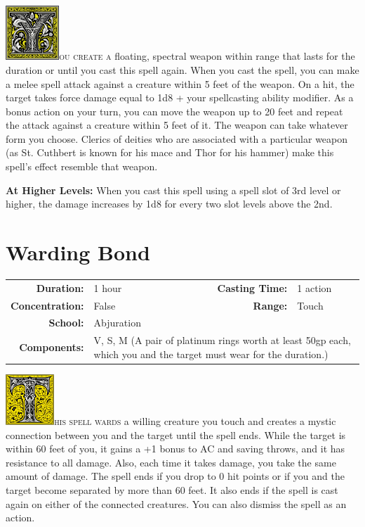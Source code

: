 \documentclass[12pt,showtrims]{memoir}
\begin{document}
\vspace{1\baselineskip}\noindent 
\lettrine[lines=4]{\includegraphics[height=58pt]{initials/Y.png}}{ou create a} floating, spectral weapon within range that lasts for the duration or until you cast this spell again. When you cast the spell, you can make a melee spell attack against a creature within 5 feet of the weapon. On a hit, the target takes force damage equal to 1d8 + your spellcasting ability modifier. As a bonus action on your turn, you can move the weapon up to 20 feet and repeat the attack against a creature within 5 feet of it. The weapon can take whatever form you choose. Clerics of deities who are associated with a particular weapon (as St. Cuthbert is known for his mace and Thor for his hammer) make this spell's effect resemble that weapon.

\vspace{8pt} \noindent\textbf{At Higher Levels:} When you cast this spell using a spell slot of 3rd level or higher, the damage increases by 1d8 for every two slot levels above the 2nd.
\newpage
\section*{Warding Bond}

{
\small\centering\vspace{-6pt}
\begin{tabular}{rlrl}
\toprule

\textbf{Duration:} & 1 hour &
\textbf{Casting Time:} & 1 action \\
\textbf{Concentration:} & False &
\textbf{Range:} & Touch \\
\textbf{School:} & Abjuration \\
\textbf{Components:} & \multicolumn{3}{p{0.7\textwidth}}{V, S, M (A pair of platinum rings worth at least 50gp each, which you and the target must wear for the duration.)}\\

\bottomrule
\end{tabular}
}

\vspace{1\baselineskip}\noindent
\lettrine[lines=4]{\includegraphics[height=54pt]{initials/T.png}}{his spell wards} a willing creature you touch and creates a mystic connection between you and the target until the spell ends. While the target is within 60 feet of you, it gains a +1 bonus to AC and saving throws, and it has resistance to all damage. Also, each time it takes damage, you take the same amount of damage. The spell ends if you drop to 0 hit points or if you and the target become separated by more than 60 feet. It also ends if the spell is cast again on either of the connected creatures. You can also dismiss the spell as an action.
\newpage
\end{document}
